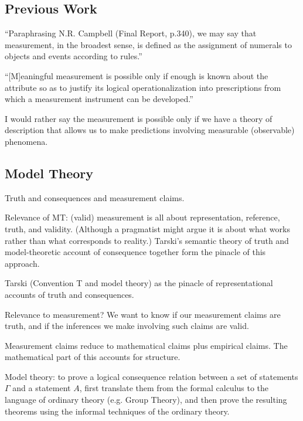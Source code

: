 \documentclass[11pt,twoside]{article}
\begin{document}
\clearpage
\appendix
\begin{appendices}

\clearpage
\section{Previous Work}

``Paraphrasing N.R. Campbell (Final Report, p.340), we may say that
measurement, in the broadest sense, is defined as the assignment of
numerals to objects and events according to rules.''
\parencite[677]{stevens_theory_1946}


``[M]eaningful measurement is possible only if enough is known about
the attribute so as to justify its logical operationalization into
prescriptions from which a measurement instrument can be developed.''
\parencite[787]{sijtsma_psychological_2012}

I would rather say the measurement is possible only if we have a
theory of description that allows us to make predictions involving
measurable (observable) phenomena.

\subsection{Model Theory}

Truth and consequences and measurement claims.

Relevance of MT: (valid) measurement is all about representation,
reference, truth, and validity.  (Although a pragmatist might argue it
is about what works rather than what corresponds to reality.)
Tarski's semantic theory of truth and model-theoretic account of
consequence together form the pinacle of this approach.

Tarski (Convention T and model theory) as the pinacle of
representational accounts of truth and consequences.

Relevance to measurement?  We want to know if our measurement claims
are truth, and if the inferences we make involving such claims are
valid.

Measurement claims reduce to mathematical claims plus empirical
claims.  The mathematical part of this accounts for structure.

Model theory: to prove a logical consequence relation between a set of
statements $\Gamma$ and a statement $A$, first translate them from the
formal calculus to the language of ordinary theory (e.g. Group
Theory), and then prove the resulting theorems using the informal
techniques of the ordinary theory.


\end{appendices}
\end{document}
